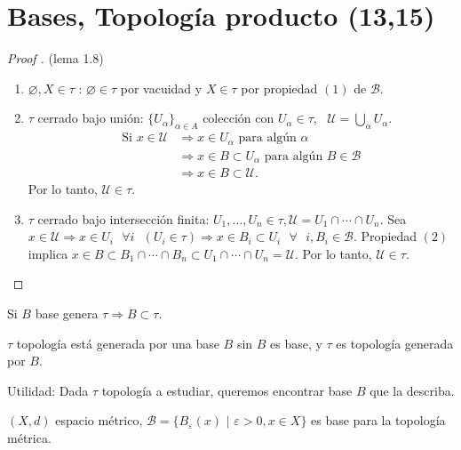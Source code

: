 
\section{Bases, Topología producto (13,15)}

\begin{proof}[Proof ] (lema 1.8)
	\begin{enumerate}
		\item $\varnothing, X \in \tau \text{ : } \varnothing \in \tau$ por vacuidad y $X \in \tau$ por propiedad $(1)$ de $\mathcal{B}$.

		\item $\tau$ cerrado bajo unión: $\{ U_{\alpha} \}_{\alpha \in A}$ colección con $U_{\alpha} \in \tau, \text{ } \mathcal{U} = \bigcup_{\alpha} U_{\alpha}$.
		\begin{align*}
			\text{Si } x \in \mathcal{U} & \Rightarrow x \in U_{\alpha} \text{ para algún } \alpha \\
			& \Rightarrow x \in B \subset U_{\alpha} \text{ para algún } B \in \mathcal{B} \\
			& \Rightarrow x \in B \subset \mathcal{U}.
		\end{align*}
		Por lo tanto, $\mathcal{U} \in \tau$.

		\item $\tau$ cerrado bajo intersección finita: $U_1,\dots,U_n \in \tau, \mathcal{U} = U_1 \cap \cdots \cap U_n$. Sea $x \in \mathcal{U} \Rightarrow x \in U_i \text{ } \forall i \text{ } (U_i \in \tau) \Rightarrow x \in B_i \subset U_i \text{ } \forall \text{ } i, B_i \in \mathcal{B}$. Propiedad $(2)$ implica $x \in B \subset B_1 \cap \cdots \cap B_n \subset U_1 \cap \cdots \cap U_n = \mathcal{U}$. Por lo tanto, $\mathcal{U} \in \tau$.
	\end{enumerate}
\end{proof}

\begin{note}
	Si $B$ base genera $\tau \Rightarrow B \subset \tau$.
\end{note}

\begin{definition}
	$\tau$ topología está generada por una base $B$ sin $B$ es base, y $\tau$ es topología generada por $B$.
\end{definition}

Utilidad: Dada $\tau$ topología a estudiar, queremos encontrar base $B$ que la describa.

\begin{eg}
	$(X,d)$ espacio métrico, $\mathcal{B} = \{ B_{\varepsilon} (x) \text{ | } \varepsilon > 0, x \in X \}$ es base para la topología métrica.  
\end{eg}

